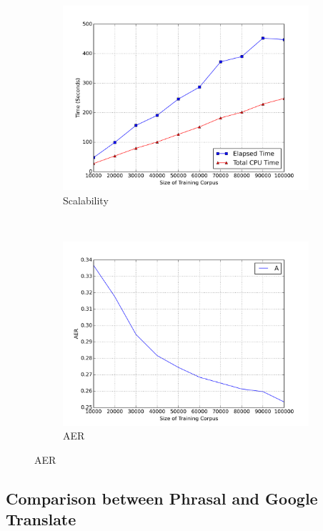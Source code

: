 \documentclass{article}
\begin{document}
\begin{figure}[!htb]
\centering
\begin{subfigure}[b]{0.45\textwidth}
\includegraphics[width=\textwidth]{time}
\caption{Scalability}
\label{fig:scale}
\end{subfigure}%
~ %
\begin{subfigure}[b]{0.45\textwidth}
\includegraphics[width=\textwidth]{aer}
\caption{AER}
\label{fig:aer}
\end{subfigure}
\end{figure}

\subsection{Comparison between Phrasal and Google Translate}
\end{document}
